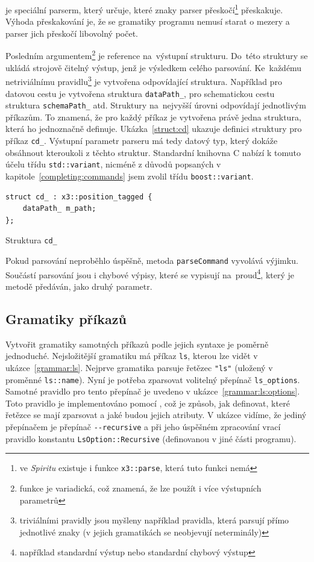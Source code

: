 \documentclass[thesis=B,czech,hidelinks]{FITthesis}[2019/03/06]
\newcommand{\Rplus}{\protect\hspace{-.1em}\protect\raisebox{.35ex}{\smaller{\smaller\textbf{+}}}}
\newcommand{\Cpp}{\mbox{C\Rplus\Rplus}\xspace}
\begin{document}
 je speciální parserm, který určuje, které znaky parser přeskočí\footnote{ve \textit{Spiritu} existuje i funkce \texttt{x3::parse}, která tuto funkci nemá} přeskakuje. Výhoda přeskakování je, že se gramatiky programu nemusí starat o mezery a parser jich přeskočí libovolný počet.

Posledním argumentem\footnote{funkce je variadická, což znamená, že lze použít i více výstupních parametrů} je reference na~výstupní strukturu. Do~této struktury se ukládá strojově čitelný výstup, jenž je výsledkem celého parsování. Ke~každému netriviálnímu pravidlu\footnote{triviálními pravidly jsou myšleny například pravidla, která parsují přímo jednotlivé znaky (v jejich gramatikách se neobjevují neterminály)} je vytvořena odpovídající struktura. Například pro datovou cestu je vytvořena struktura \texttt{dataPath\_}, pro schematickou cestu struktura \texttt{schemaPath\_} atd. Struktury na~nejvyšší úrovni odpovídají jednotlivým příkazům. To znamená, že pro každý příkaz je vytvořena právě jedna struktura, která ho jednoznačně definuje. Ukázka~\ref{struct:cd} ukazuje definici struktury pro příkaz \texttt{cd\_}. Výstupní parametr parseru má tedy datový typ, který dokáže obsáhnout kteroukoli z těchto struktur. Standardní knihovna \Cpp{} nabízí k tomuto účelu třídu \texttt{std::variant}, nicméně z důvodů popsaných v kapitole~\ref{completing:commands} jsem zvolil třídu \texttt{boost::variant}.

\begin{listing}
\begin{verbatim}
struct cd_ : x3::position_tagged {
    dataPath_ m_path;
};
\end{verbatim}
\caption{Struktura \texttt{cd\_}}\label{struct:cd}
\end{listing}

Pokud parsování neproběhlo úspěšně, metoda \texttt{parseCommand} vyvolává výjimku. Součástí parsování jsou i chybové výpisy, které se vypisují na~proud\footnote{například standardní výstup nebo standardní chybový výstup}, který je metodě předáván, jako druhý parametr.

\subsection{Gramatiky příkazů}
Vytvořit gramatiky samotných příkazů podle jejich syntaxe je poměrně jednoduché. Nejsložitější gramatiku má příkaz \texttt{ls}, kterou lze vidět v ukázce~\ref{grammar:ls}. Nejprve gramatika parsuje řetězec \verb¨"ls"¨ (uložený v proměnné \verb¨ls::name¨). Nyní je potřeba zparsovat volitelný přepínač \verb¨ls_options¨. Samotné pravidlo pro tento přepínač je uvedeno v ukázce~\ref{grammar:ls:options}. Toto pravidlo je implementováno pomocí , což je způsob, jak definovat, které řetězce se mají zparsovat a jaké budou jejich atributy. V ukázce vidíme, že jediný přepínačem je přepínač \verb¨--recursive¨ a při jeho úspěšném zpracování vrací pravidlo konstantu \texttt{LsOption::Recursive} (definovanou v jiné části programu).
\end{document}
